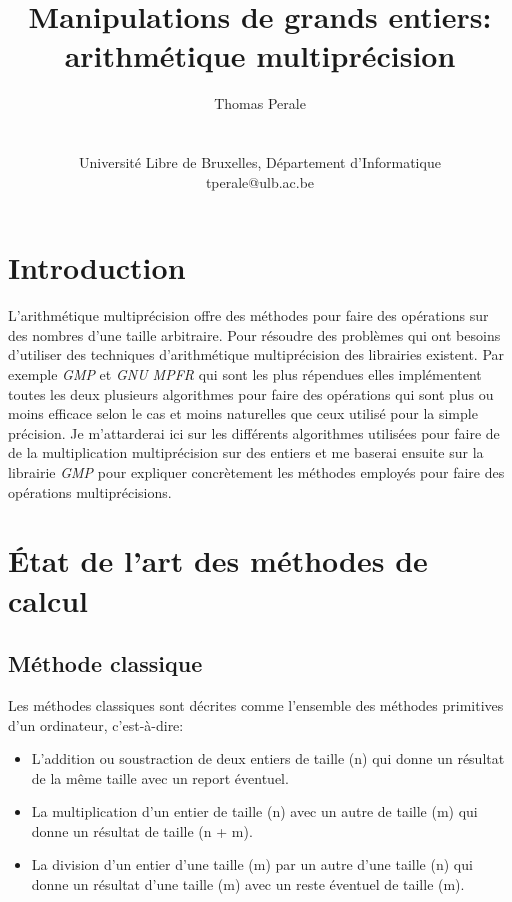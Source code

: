 \documentclass[letterpaper]{article}
\title{Manipulations de grands entiers: arithmétique multiprécision}
\author{Thomas Perale\\
    \mbox{}\\\\
    Université Libre de Bruxelles, Département d'Informatique\\
    tperale@ulb.ac.be\\
}
\begin{document}
\maketitle

\begin{abstract}

\end{abstract}

\section{Introduction}

L'arithmétique multiprécision offre des méthodes pour faire des opérations sur
des nombres d'une taille arbitraire. Pour résoudre des problèmes qui ont
besoins d'utiliser des techniques d'arithmétique multiprécision des librairies
existent. Par exemple \emph{GMP} et \emph{GNU MPFR} qui sont les plus
répendues elles implémentent toutes les deux plusieurs algorithmes pour faire
des opérations qui sont plus ou moins efficace selon le cas et moins naturelles
que ceux utilisé pour la simple précision.
Je m'attarderai ici sur les différents algorithmes utilisées pour faire de
de la multiplication multiprécision sur des entiers et me baserai ensuite sur
la librairie \emph{GMP} pour expliquer concrètement les méthodes employés pour
faire des opérations multiprécisions.

\section{État de l'art des méthodes de calcul}

\subsection{Méthode classique}

Les méthodes classiques sont décrites comme l'ensemble des méthodes primitives
d'un ordinateur\cite{knuth1997aocp}, c'est-à-dire:

\begin{itemize}
    \item L'addition ou soustraction de deux entiers de taille (n) qui donne
        un résultat de la même taille avec un report éventuel.
    \item La multiplication d'un entier de taille (n) avec un autre de taille
        (m) qui donne un résultat de taille (n + m).
    \item La division d'un entier d'une taille (m) par un autre d'une taille
        (n) qui donne un résultat d'une taille (m) avec un reste éventuel de
        taille (m).
\end{itemize}
\end{document}
